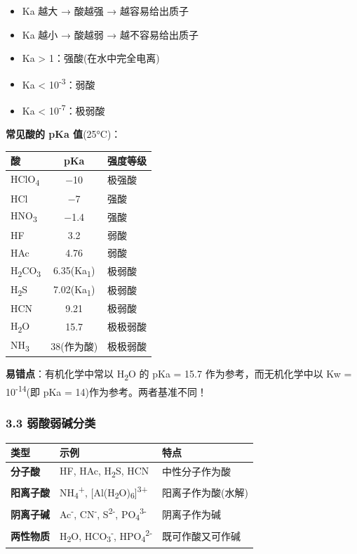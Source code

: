 \begin{itemize}
\tightlist
\item
  Ka 越大 → 酸越强 → 越容易给出质子
\item
  Ka 越小 → 酸越弱 → 越不容易给出质子
\item
  Ka \textgreater{} 1：强酸(在水中完全电离)
\item
  Ka \textless{} 10\textsuperscript{-3}：弱酸
\item
  Ka \textless{} 10\textsuperscript{-7}：极弱酸
\end{itemize}

\textbf{常见酸的 pKa 值}(25°C)：

{\def\LTcaptype{none} %
\begin{longtable}[]{@{}lcl@{}}
\toprule\noalign{}
酸 & pKa & 强度等级 \\
\midrule\noalign{}
\endhead
\bottomrule\noalign{}
\endlastfoot
HClO\textsubscript{4} & −10 & 极强酸 \\
HCl & −7 & 强酸 \\
HNO\textsubscript{3} & −1.4 & 强酸 \\
HF & 3.2 & 弱酸 \\
HAc & 4.76 & 弱酸 \\
H\textsubscript{2}CO\textsubscript{3} & 6.35(Ka\textsubscript{1}) & 极弱酸 \\
H\textsubscript{2}S & 7.02(Ka\textsubscript{1}) & 极弱酸 \\
HCN & 9.21 & 极弱酸 \\
H\textsubscript{2}O & 15.7 & 极极弱酸 \\
NH\textsubscript{3} & 38(作为酸) & 极极弱酸 \\
\end{longtable}
}

\textbf{易错点}：有机化学中常以 H\textsubscript{2}O 的 pKa = 15.7 作为参考，而无机化学中以 Kw = 10\textsuperscript{-14}(即 pKa = 14)作为参考。两者基准不同！

\subsubsection{3.3 弱酸弱碱分类}\label{ux5f31ux9178ux5f31ux78b1ux5206ux7c7b}

{\def\LTcaptype{none} %
\begin{longtable}[]{@{}lll@{}}
\toprule\noalign{}
类型 & 示例 & 特点 \\
\midrule\noalign{}
\endhead
\bottomrule\noalign{}
\endlastfoot
\textbf{分子酸} & HF, HAc, H\textsubscript{2}S, HCN & 中性分子作为酸 \\
\textbf{阳离子酸} & NH\textsubscript{4}\textsuperscript{+}, {[}Al(H\textsubscript{2}O)\textsubscript{6}{]}\textsuperscript{3+} & 阳离子作为酸(水解) \\
\textbf{阴离子碱} & Ac\textsuperscript{-}, CN\textsuperscript{-}, S\textsuperscript{2-}, PO\textsubscript{4}\textsuperscript{3-} & 阴离子作为碱 \\
\textbf{两性物质} & H\textsubscript{2}O, HCO\textsubscript{3}\textsuperscript{-}, HPO\textsubscript{4}\textsuperscript{2-} & 既可作酸又可作碱 \\
\end{longtable}
}

